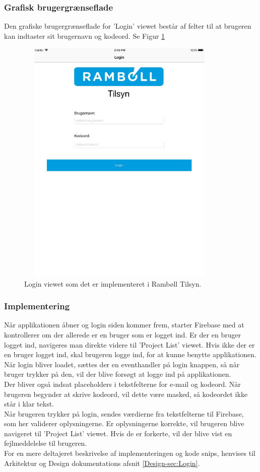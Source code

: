 \subsubsection{Grafisk brugergrænseflade}
Den grafiske brugergrænseflade for 'Login' viewet består af felter til at brugeren kan indtaster sit brugernavn og kodeord. Se Figur \ref{fig:LoginView}
\begin{figure}[H] %
	\centering
	\includegraphics[height=12cm, width=10cm]{Design/Applikation/Login/LoginView}
	\caption{Login viewet som det er implementeret i Rambøll Tilsyn.}
	\label{fig:LoginView}
\end{figure}

\subsubsection{Implementering}
Når applikationen åbner og login siden kommer frem, starter Firebase med at kontrollerer om der allerede er en bruger som er logget ind. Er der en bruger logget ind, navigeres man direkte videre til 'Project List' viewet. Hvis ikke der er en bruger logget ind, skal brugeren logge ind, for at kunne benytte applikationen. \\
Når login bliver loadet, sættes der en eventhandler på login knappen, så når bruger trykker på den, vil der blive forsøgt at logge ind på applikationen. \\
Der bliver også indsat placeholders i tekstfelterne for e-mail og kodeord. Når brugeren begynder at skrive kodeord, vil dette være masked, så kodeordet ikke står i klar tekst. \\
Når brugeren trykker på login, sendes værdierne fra tekstfelterne til Firebase, som her validerer oplysningerne. Er oplysningerne korrekte, vil brugeren blive navigeret til 'Project List' viewet. Hvis de er forkerte, vil der blive vist en fejlmeddelelse til brugeren. \\
For en mere deltajeret beskrivelse af implementeringen og kode snips, henvises til Arkitektur og Design dokumentations afsnit \ref{Design-sec:Login}.

\clearpage